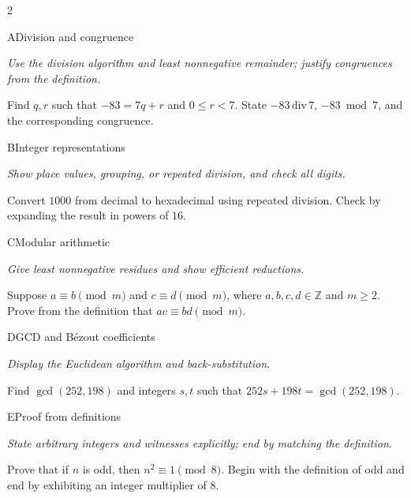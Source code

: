 \documentclass[9pt]{extarticle}
\begin{document}
\begin{multicols}{2}
\begin{CoreProblem}{A}{Division and congruence}
{\scriptsize\textit{Use the division algorithm and least nonnegative remainder; justify congruences from the definition.}\par}
Find $q,r$ such that $-83=7q+r$ and $0\le r<7$. State
$-83\,\mathrm{div}\,7$, $-83\bmod7$, and the corresponding congruence.
\end{CoreProblem}
\begin{CoreProblem}{B}{Integer representations}
{\scriptsize\textit{Show place values, grouping, or repeated division, and check all digits.}\par}
Convert $1000$ from decimal to hexadecimal using repeated division. Check by
expanding the result in powers of $16$.
\end{CoreProblem}
\begin{CoreProblem}{C}{Modular arithmetic}
{\scriptsize\textit{Give least nonnegative residues and show efficient reductions.}\par}
Suppose $a\equiv b\pmod m$ and $c\equiv d\pmod m$, where
$a,b,c,d\in\mathbb Z$ and $m\ge2$. Prove from the definition that
$ac\equiv bd\pmod m$.
\end{CoreProblem}
\columnbreak
\begin{CoreProblem}{D}{GCD and B\'ezout coefficients}
{\scriptsize\textit{Display the Euclidean algorithm and back-substitution.}\par}
Find $\gcd(252,198)$ and integers $s,t$ such that
$252s+198t=\gcd(252,198)$.
\end{CoreProblem}
\begin{CoreProblem}{E}{Proof from definitions}
{\scriptsize\textit{State arbitrary integers and witnesses explicitly; end by matching the definition.}\par}
Prove that if $n$ is odd, then $n^2\equiv1\pmod{8}$. Begin with the definition
of odd and end by exhibiting an integer multiplier of $8$.
\end{CoreProblem}
\end{multicols}
\CoreWorkArea
\FormBreak
{}
\end{document}
